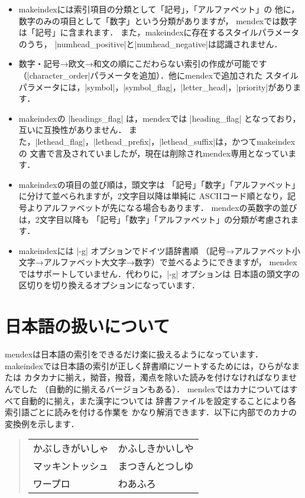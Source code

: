 \documentclass[a4paper,dvipdfmx]{jsarticle}
\newcommand{\SoftName}[1]{\textsf{#1}}
\begin{document}
\begin{itemize}
\item \SoftName{makeindex}には索引項目の分類として「記号」，「アルファベット」の
  他に，数字のみの項目として「数字」という分類がありますが，
  \SoftName{mendex}では数字は「記号」に含まれます．
  また，\SoftName{makeindex}に存在するスタイルパラメータのうち，
  |numhead_positive|と|numhead_negative|は認識されません．

\item 数字・記号→欧文→和文の順にこだわらない索引の作成が可能です
  （|character_order|パラメータを追加）．他に\SoftName{mendex}で追加された
  スタイルパラメータには，|symbol|，|symbol_flag|，|letter_head|，|priority|があります．

\item \SoftName{makeindex}の |headings_flag| は，\SoftName{mendex}では
  |heading_flag| となっており，互いに互換性がありません．
  また，|lethead_flag|，|lethead_prefix|，|lethead_suffix|は，かつて\SoftName{makeindex}の
  文書で言及されていましたが，現在は削除され\SoftName{mendex}専用となっています．

\item \SoftName{makeindex}の項目の並び順は，頭文字は
  「記号」「数字」「アルファベット」に分けて並べられますが，2文字目以降は単純に
  ASCIIコード順となり，記号よりアルファベットが先になる場合もあります．
  \SoftName{mendex}の英数字の並びは，2文字目以降も
  「記号」「数字」「アルファベット」の分類が考慮されます．

\item \SoftName{makeindex}には |-g| オプションでドイツ語辞書順
  （記号→アルファベット小文字→アルファベット大文字→数字）で並べるようにできますが，
  \SoftName{mendex}ではサポートしていません．代わりに，|-g| オプションは
  日本語の頭文字の区切りを切り換えるオプションになっています．
\end{itemize}

\section{日本語の扱いについて}

\SoftName{mendex}は日本語の索引をできるだけ楽に扱えるようになっています．
\SoftName{makeindex}では日本語の索引が正しく辞書順にソートするためには，ひらがなまたは
カタカナに揃え，拗音，撥音，濁点を除いた読みを付けなければなりませんでした
（自動的に揃えるバージョンもある）．
\SoftName{mendex}ではカナについてはすべて自動的に揃え，また漢字については
辞書ファイルを設定することにより各索引語ごとに読みを付ける作業を
かなり解消できます．以下に内部でのカナの変換例を示します．
%
\begin{quote}
\begin{tabular}{ll}
かぶしきがいしゃ & かふしきかいしや \\
マッキントッシュ & まつきんとつしゆ \\
ワープロ & わあふろ
\end{tabular}
\end{quote}
\end{document}
